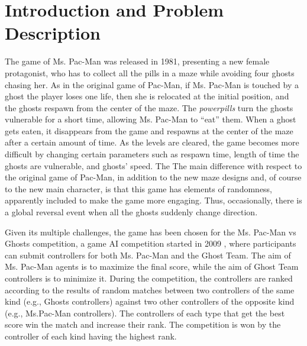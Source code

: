\documentclass[a4paper]{llncs}
\begin{document}
\section{Introduction and Problem Description}
\label{sec:intro}

The game of Ms. Pac-Man was released in 1981, presenting a new female protagonist, who has to collect all the pills in a maze while avoiding four ghosts chasing her. As in the original game of Pac-Man, if Ms. Pac-Man is touched by a ghost the player loses one life, then she is relocated at the initial position, and the ghosts respawn from the center of the maze. The {\em powerpills} turn the ghosts vulnerable for a short time, allowing Ms. Pac-Man to ``eat'' them. When a ghost gets eaten, it disappears from the game and respawns at the center of the maze after a certain amount of time. As the levels are cleared, the game becomes more difficult by changing certain parameters such as respawn time, length of time the ghosts are vulnerable, and ghosts' speed. The 
The main difference with respect to the original game of Pac-Man, in addition to the new maze designs and, of course to the new main character, is that this game has elements of randomness, apparently included to make the game more engaging. Thus, occasionally, there is a global reversal event when all the ghosts suddenly change direction.

Given its multiple challenges, the game has been chosen for the Ms. Pac-Man vs Ghosts competition, a game AI competition started in 2009 \cite{Lucas2009}, where participants can submit controllers for both Ms. Pac-Man and the Ghost Team. The aim of Ms. Pac-Man agents is to maximize the final score, while the aim of Ghost Team controllers is to minimize it. 
During the competition, the controllers are ranked according to the results of random matches between two controllers of the same kind (e.g., Ghosts controllers) against two other controllers of the opposite kind (e.g., Ms.Pac-Man controllers). The controllers of each type that get the best score win the match and increase their rank. The competition is won by the controller of each kind having the highest rank.
\end{document}
